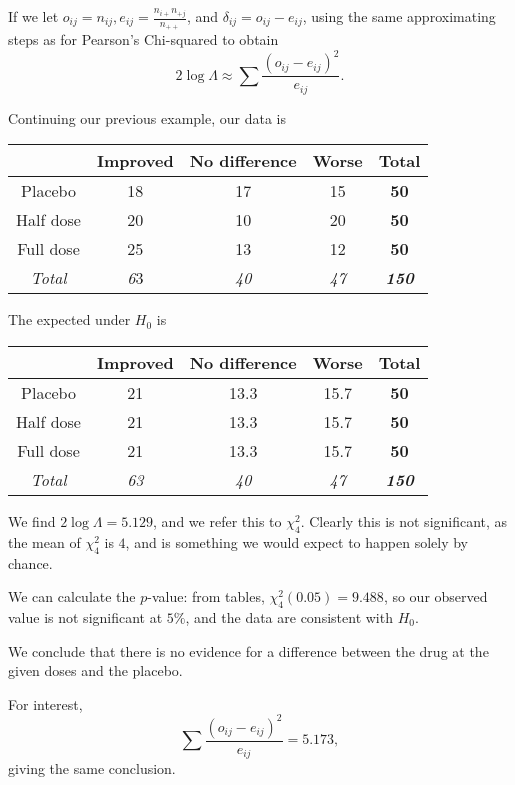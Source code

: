 \documentclass[a4paper]{article}
\begin{document}
If we let $o_{ij}= n_{ij}, e_{ij} = \frac{n_{i+}n_{+j}}{n_{++}}$, and $\delta_{ij} = o_{ij} - e_{ij}$, using the same approximating steps as for Pearson's Chi-squared to obtain
\[
  2\log \Lambda \approx \sum \frac{(o_{ij} - e_{ij})^2}{e_{ij}}.
\]
\begin{eg}
  Continuing our previous example, our data is
  \begin{center}
    \begin{tabular}{ccccc}
      \toprule
      & Improved & No difference & Worse & \textbf{Total}\\\midrule
      Placebo & 18 & 17 & 15 & \textbf{50} \\
      Half dose & 20 & 10 & 20 & \textbf{50} \\
      Full dose & 25 & 13 & 12& \textbf{50} \\\midrule
      \textit{Total} & \textit{6}3 & \textit{40} & \textit{47} & \textbf{\textit{150}} \\ \bottomrule
    \end{tabular}
  \end{center}
  The expected under $H_0$ is
  \begin{center}
    \begin{tabular}{ccccc}
      \toprule
      & Improved & No difference & Worse &\textbf{Total}\\\midrule
      Placebo   & 21 & 13.3 & 15.7 & \textbf{50} \\
      Half dose & 21 & 13.3 & 15.7 & \textbf{50}\\
      Full dose & 21 & 13.3 & 15.7 & \textbf{50}\\\midrule
      \textit{Total}& \textit{63} & \textit{40} & \textit{47} & \textbf{\textit{150}}\\ \bottomrule
    \end{tabular}
  \end{center}
  We find $2\log \Lambda = 5.129$, and we refer this to $\chi_4^2$. Clearly this is not significant, as the mean of $\chi_4^2$ is $4$, and is something we would expect to happen solely by chance.

  We can calculate the $p$-value: from tables, $\chi_4^2(0.05) = 9.488$, so our observed value is not significant at $5\%$, and the data are consistent with $H_0$.

  We conclude that there is no evidence for a difference between the drug at the given doses and the placebo.

  For interest,
  \[
    \sum\frac{(o_{ij} - e_{ij})^2}{e_{ij}} = 5.173,
  \]
  giving the same conclusion.
\end{eg}
\end{document}
